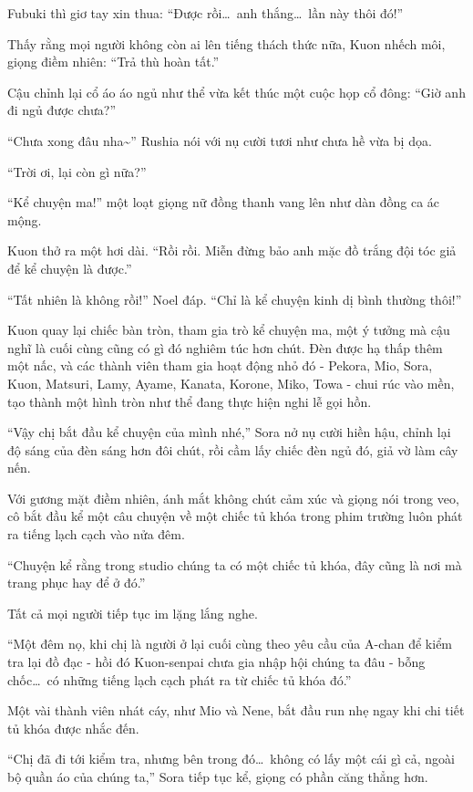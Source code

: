 \documentclass[../main.tex]{subfiles}
\begin{document}
Fubuki thì giơ tay xin thua: ``Được rồi\dots\ anh thắng\dots\ lần này thôi đó!''

Thấy rằng mọi người không còn ai lên tiếng thách thức nữa, Kuon nhếch môi, giọng điềm nhiên: ``Trả thù hoàn tất.''

Cậu chỉnh lại cổ áo áo ngủ như thể vừa kết thúc một cuộc họp cổ đông: ``Giờ anh đi ngủ được chưa?''

``Chưa xong đâu nha\~{}'' Rushia nói với nụ cười tươi như chưa hề vừa bị dọa.

``Trời ơi, lại còn gì nữa?''

``Kể chuyện ma!''
một loạt giọng nữ đồng thanh vang lên như dàn đồng ca ác mộng.

Kuon thở ra một hơi dài. ``Rồi rồi. Miễn đừng bảo anh mặc đồ trắng đội tóc giả để kể chuyện là được.''

``Tất nhiên là không rồi!'' Noel đáp. ``Chỉ là kể chuyện kinh dị bình thường thôi!''

\ct

Kuon quay lại chiếc bàn tròn, tham gia trò kể chuyện ma, một ý tưởng mà cậu nghĩ là cuối cùng cũng có gì đó nghiêm túc hơn chút. Đèn được hạ thấp thêm một nấc, và các thành viên tham gia hoạt động nhỏ đó - Pekora, Mio, Sora, Kuon, Matsuri, Lamy, Ayame, Kanata, Korone, Miko, Towa - chui rúc vào mền, tạo thành một hình tròn như thể đang thực hiện nghi lễ gọi hồn.

``Vậy chị bắt đầu kể chuyện của mình nhé,'' Sora nở nụ cười hiền hậu, chỉnh lại độ sáng của đèn sáng hơn đôi chút, rồi cầm lấy chiếc đèn ngủ đó, giả vờ làm cây nến.

Với gương mặt điềm nhiên, ánh mắt không chút cảm xúc và giọng nói trong veo, cô bắt đầu kể một câu chuyện về một chiếc tủ khóa trong phim trường luôn phát ra tiếng lạch cạch vào nửa đêm.

``Chuyện kể rằng trong studio chúng ta có một chiếc tủ khóa, đây cũng là nơi mà trang phục hay để ở đó.''

Tất cả mọi người tiếp tục im lặng lắng nghe.

``Một đêm nọ, khi chị là người ở lại cuối cùng theo yêu cầu của A-chan để kiểm tra lại đồ đạc - hồi đó Kuon-senpai chưa gia nhập hội chúng ta đâu - bỗng chốc\dots\ có những tiếng lạch cạch phát ra từ chiếc tủ khóa đó.''

Một vài thành viên nhát cáy, như Mio và Nene, bắt đầu run nhẹ ngay khi chi tiết tủ khóa được nhắc đến.

``Chị đã đi tới kiểm tra, nhưng bên trong đó\dots\ không có lấy một cái gì cả, ngoài bộ quần áo của chúng ta,'' Sora tiếp tục kể, giọng có phần căng thẳng hơn.
\end{document}
